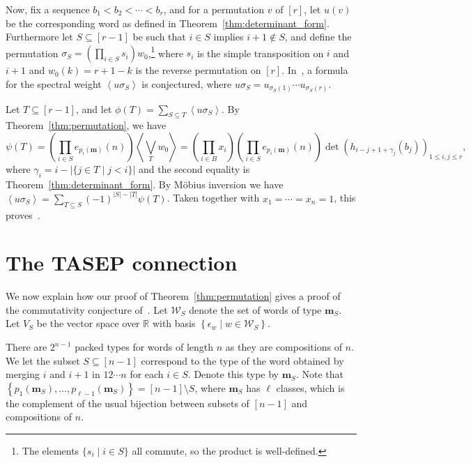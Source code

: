 \documentclass[reqno]{amsart}
\newcommand{\0}{\phantom{c}}
\newcommand{\swt}[1]{\left\langle #1 \right\rangle} %
\newcommand{\mm}{\mathbf{m}}
\newcommand{\mcW}{\mathcal{W}}
\newcommand{\RR}{\mathbb{R}}
\let\sumnonlimits\sum
\let\prodnonlimits\prod
\renewcommand{\sum}{\sumnonlimits\limits}
\renewcommand{\prod}{\prodnonlimits\limits}
\newcommand{\set}[1]{\left\{ #1 \right\}}
\newcommand{\ive}[1]{\left[ #1 \right]}
\theoremstyle{plain}
\theoremstyle{definition}
\numberwithin{equation}{section}
\begin{document}
Now, fix a sequence $b_1 < b_2 < \cdots < b_r$, and for a permutation $v$ of $\ive{r}$, let $u(v)$ be the corresponding word as defined in Theorem~\ref{thm:determinant_form}.
Furthermore let $S \subseteq \ive{r-1}$ be such that $i\in S$ implies $i+1 \notin S$, and define the permutation $\sigma_S = \left( \prod_{i \in S} s_i \right) w_0$,\footnote{The elements $\{s_i \mid i \in S\}$ all commute, so the product is well-defined.} where $s_i$ is the simple transposition on $i$ and $i+1$ and $w_0(k) = r+1-k$ is the reverse permutation on $\ive{r}$.
In~\cite{AasLin17}, a formula for the spectral weight $\swt{u \sigma_S}$ is conjectured, where $u \sigma_S = u_{\sigma_S(1)} \cdots u_{\sigma_S(r)}$.

Let $T \subseteq \ive{r-1}$, and let $\phi(T) = \sum_{S \subseteq T} \swt{u \sigma_S}$.
By Theorem~\ref{thm:permutation}, we have
\[
  \psi(T) = \left(\prod_{i\in S} e_{p_i(\mm)}(n) \right) \swt{ \bigvee_T w_0} = \left( \prod_{i\in B} x_i \right) \left(\prod_{i\in S} e_{p_i(\mm)}(n) \right) \det(h_{i-j+1+\gamma_j}(b_j))_{1\leq i,j \leq r},
\]
where $\gamma_i = i - \lvert \{j\in T \mid j < i \} \rvert$ and the second equality is Theorem~\ref{thm:determinant_form}.
By M\"obius inversion we have $\swt{u \sigma_S} = \sum_{T\subseteq S} (-1)^{|S|-|T|} \psi(T)$.
Taken together with $x_1 = \cdots = x_n = 1$, this proves~\cite[Conj.~3.10]{AasLin17}.









\section{The TASEP connection}

We now explain how our proof of Theorem~\ref{thm:permutation} gives a proof of the commutativity conjecture of~\cite{AAMP}.
Let $\mcW_S$ denote the set of words of type $\mm_S$.
Let $V_S$ be the vector space over $\RR$ with basis $\set{\epsilon_w \mid w \in \mcW_S}$.

There are $2^{n-1}$ packed types for words of length $n$ as they are compositions of $n$.
We let the subset $S \subseteq [n-1]$ correspond to the type of the word obtained by merging $i$ and $i+1$ in $12 \dotsm n$ for each $i \in S$.
Denote this type by $\mm_S$.
Note that $\set{p_1(\mm_S), \dotsc, p_{\ell-1}(\mm_S)} = [n-1] \setminus S$, where $\mm_S$ has $\ell$ classes, which is the complement of the usual bijection between subsets of $\ive{n-1}$ and compositions of $n$.
\end{document}
